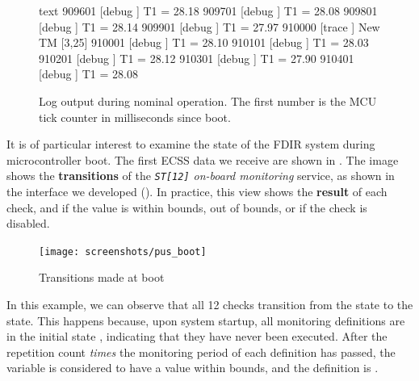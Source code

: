\documentclass[a4paper,nobib,final]{tufte-book}
\begin{document}
\begin{figure}
\begin{cminted}{text}
909601  [debug  ] T1 = 28.18
909701  [debug  ] T1 = 28.08
909801  [debug  ] T1 = 28.14
909901  [debug  ] T1 = 27.97
910000  [trace  ] New TM [3,25]
910001  [debug  ] T1 = 28.10
910101  [debug  ] T1 = 28.03
910201  [debug  ] T1 = 28.12
910301  [debug  ] T1 = 27.90
910401  [debug  ] T1 = 28.08
\end{cminted}
\caption[Log output during nominal operation]{Log output during nominal operation. The first number is the \ac{MCU} tick counter in milliseconds since boot.}
\label{fig:lognominal}
\end{figure}


It is of particular interest to examine the state of the \acs{FDIR} system during microcontroller boot. The first \acs{ECSS} data we receive are shown in . The image shows the \textbf{transitions} of the \emph{\texttt{ST[12]} on-board monitoring} service, as shown in the interface we developed (). In practice, this view shows the \textbf{result} of each check, and if the value is within bounds, out of bounds, or if the check is disabled.

\begin{figure}
	\texttt{[image: screenshots/pus\_boot]}
	\caption{Transitions made at boot}
	\label{fig:pus_boot}
\end{figure}

In this example, we can observe that all 12 checks transition from the \unchecked{} state to the \ok{} state. This happens because, upon system startup, all monitoring definitions are in the initial state \unchecked, indicating that they have never been executed. After the repetition count \textsl{times} the monitoring period of each definition has passed, the variable is considered to have a value within bounds, and the definition is \ok.
\end{document}
